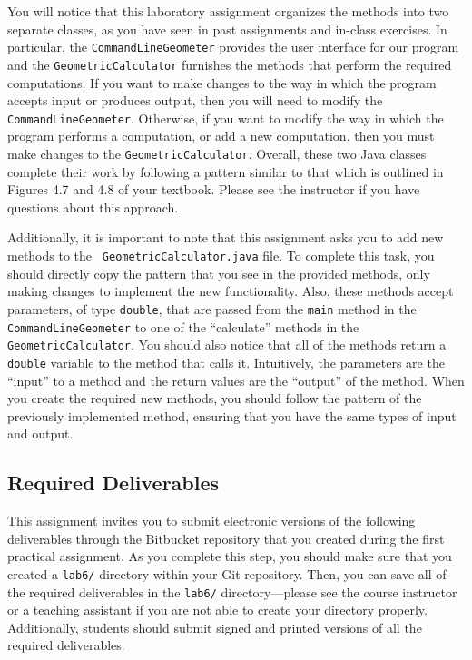 You will notice that this laboratory assignment organizes the methods into two separate classes, as you have seen in
past assignments and in-class exercises. In particular, the {\tt CommandLineGeometer} provides the user interface for
our program and the {\tt GeometricCalculator} furnishes the methods that perform the required computations.  If you want
to make changes to the way in which the program accepts input or produces output, then you will need to modify the {\tt
  CommandLineGeometer}. Otherwise, if you want to modify the way in which the program performs a computation, or add a
new computation, then you must make changes to the {\tt GeometricCalculator}. Overall, these two Java classes complete
their work by following a pattern similar to that which is outlined in Figures 4.7 and 4.8 of your textbook. Please see
the instructor if you have questions about this approach.

Additionally, it is important to note that this assignment asks you to add new methods to the {\tt
  GeometricCalculator.java} file.  To complete this task, you should directly copy the pattern that you see in the
provided methods, only making changes to implement the new functionality.  Also, these methods accept parameters, of
type {\tt double}, that are passed from the {\tt main} method in the {\tt CommandLineGeometer} to one of the
``calculate'' methods in the {\tt GeometricCalculator}. You should also notice that all of the methods return a {\tt
  double} variable to the method that calls it.  Intuitively, the parameters are the ``input'' to a method and the return
values are the ``output'' of the method.  When you create the required new methods, you should follow the pattern of the
previously implemented method, ensuring that you have the same types of input and output.

\vspace*{-.1in}
\subsection*{Required Deliverables}

This assignment invites you to submit electronic versions of the following deliverables through the Bitbucket repository
that you created during the first practical assignment.  As you complete this step, you should make sure that you
created a {\tt lab6/} directory within your Git repository.  Then, you can save all of the required deliverables in the
{\tt lab6/} directory---please see the course instructor or a teaching assistant if you are not able to create your
directory properly.  Additionally, students should submit signed and printed versions of all the required deliverables.


